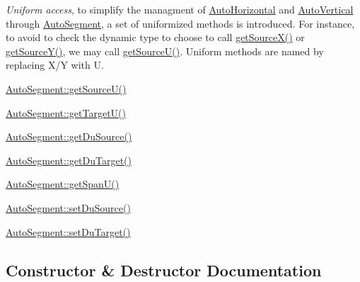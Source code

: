 \begin{DoxyItemize}
\item {\itshape Uniform access}, to simplify the managment of \hyperlink{classKatabatic_1_1AutoHorizontal}{Auto\+Horizontal} and \hyperlink{classKatabatic_1_1AutoVertical}{Auto\+Vertical} through \hyperlink{classKatabatic_1_1AutoSegment}{Auto\+Segment}, a set of uniformized methods is introduced. For instance, to avoid to check the dynamic type to choose to call \hyperlink{classKatabatic_1_1AutoSegment_a8a8e127557d70de70f9efb488be30d1a}{get\+Source\+X()} or \hyperlink{classKatabatic_1_1AutoSegment_ae913463a76d08b079611a993cebea1a9}{get\+Source\+Y()}, we may call \hyperlink{classKatabatic_1_1AutoSegment_aeaa1543880686755e389c4807128428f}{get\+Source\+U()}. Uniform methods are named by replacing {\ttfamily X/Y} with {\ttfamily U}. 
\begin{DoxyItemize}
\item \hyperlink{classKatabatic_1_1AutoSegment_aeaa1543880686755e389c4807128428f}{Auto\+Segment\+::get\+Source\+U()} 
\item \hyperlink{classKatabatic_1_1AutoSegment_a828fef2716cc9c370d6d170bb96556ec}{Auto\+Segment\+::get\+Target\+U()} 
\item \hyperlink{classKatabatic_1_1AutoSegment_ab4881df67bd8f036d0199ed6540fe774}{Auto\+Segment\+::get\+Du\+Source()} 
\item \hyperlink{classKatabatic_1_1AutoSegment_a0644d656eedc71dba2fb3c6c0d83ed3f}{Auto\+Segment\+::get\+Du\+Target()} 
\item \hyperlink{classKatabatic_1_1AutoSegment_a248eb2fbb06e3286650b28567d495f0b}{Auto\+Segment\+::get\+Span\+U()} 
\item \hyperlink{classKatabatic_1_1AutoSegment_aaf60d18ab6d951a34a3d06959ce2e76f}{Auto\+Segment\+::set\+Du\+Source()} 
\item \hyperlink{classKatabatic_1_1AutoSegment_a246756d4c8b3e094a0a9d6de3c2109ff}{Auto\+Segment\+::set\+Du\+Target()} 
\end{DoxyItemize}
\end{DoxyItemize}

\subsection{Constructor \& Destructor Documentation}
\mbox{\label{classKatabatic_1_1AutoSegment_ae64a61508d148cb4a0ee9b5ffb177659}} 
